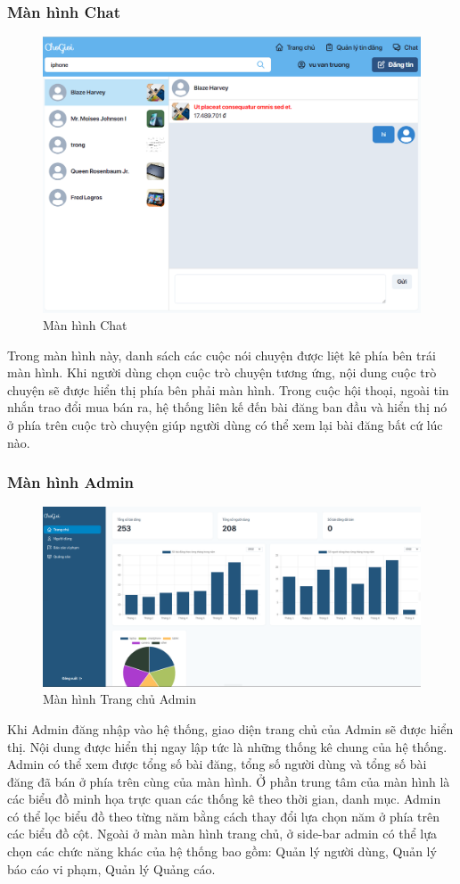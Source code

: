 \documentclass[../DoAn.tex]{subfiles}
\begin{document}
\subsubsection{Màn hình Chat}
\begin{figure}[H]
    \centering
    \includegraphics[width=0.9\linewidth]{Hinhve/4-chat.png}
    \caption{Màn hình Chat}
    \label{fig:Fig1}
\end{figure}
Trong màn hình này, danh sách các cuộc nói chuyện được liệt kê phía bên trái màn hình. Khi người dùng chọn cuộc trò chuyện tương ứng, nội dung cuộc trò chuyện sẽ được hiển thị phía bên phải màn hình. Trong cuộc hội thoại, ngoài tin nhắn trao đổi mua bán ra, hệ thống liên kế đến bài đăng ban đầu và hiển thị nó ở phía trên cuộc trò chuyện giúp người dùng có thể xem lại bài đăng bất cứ lúc nào.
\newpage
\subsubsection{Màn hình Admin}
\begin{figure}[H]
    \centering
    \includegraphics[width=0.99\linewidth]{Hinhve/6-admin.png}
    \caption{Màn hình Trang chủ Admin}
    \label{fig:Fig1}
\end{figure}
Khi Admin đăng nhập vào hệ thống, giao diện trang chủ của Admin sẽ được hiển thị. Nội dung được hiển thị ngay lập tức là những thống kê chung của hệ thống. Admin có thể xem được tổng số bài đăng, tổng số người dùng và tổng số bài đăng đã bán ở phía trên cùng của màn hình. Ở phần trung tâm của màn hình là các biểu đồ minh họa trực quan các thống kê theo thời gian, danh mục. Admin có thể lọc biểu đồ theo từng năm bằng cách thay đổi lựa chọn năm ở phía trên các biểu đồ cột. Ngoài ở màn màn hình trang chủ, ở side-bar admin có thể lựa chọn các chức năng khác của hệ thống bao gồm: Quản lý người dùng, Quản lý báo cáo vi phạm, Quản lý Quảng cáo.
\newpage
\end{document}
